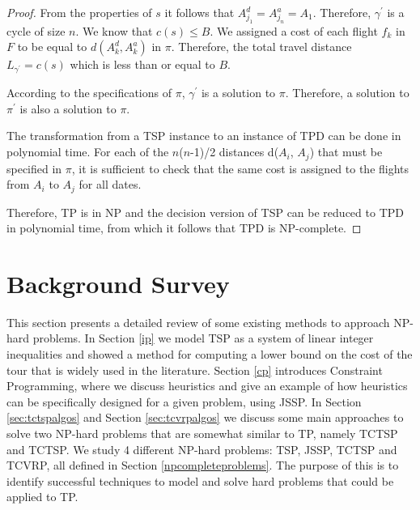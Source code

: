 \documentclass{mprop}
\theoremstyle{definition}
\begin{document}
\begin{proof}
From the properties of $s$ it follows that $A^{d}_{j_{1}} = A^{a}_{j_{n}} = A_{1}$. Therefore, $\gamma^{\prime}$ is a cycle of size $n$. We know that $c(s) \leq B$. We assigned a cost of each flight $f_{k}$ in $F$ to be equal to $d(A^{d}_{k}, A^{a}_{k})$ in $\pi$. Therefore, the total travel distance $L_{\gamma^{\prime}} = c(s)$ which is less than or equal to $B$.

According to the specifications of $\pi$, $\gamma^{\prime}$ is a solution to $\pi$. Therefore, a solution to $\pi^{\prime}$ is also a solution to $\pi$.

The transformation from a TSP instance to an instance of TPD can be done in polynomial time. For each of the $n$($n$-1)/2 distances d($A_{i}$, $A_{j}$) that must be specified in $\pi$, it is sufficient to check that the same cost is assigned to the flights from $A_{i}$ to $A_{j}$ for all dates.

Therefore, TP is in NP and the decision version of TSP can be reduced to TPD in polynomial time, from which it follows that TPD is NP-complete.

\end{proof}

\section{Background Survey}
\label{sec:existingwork}
This section presents a detailed review of some existing methods to approach NP-hard problems. In Section \ref{ip} we model TSP as a system of linear integer inequalities and showed a method for computing a lower bound on the cost of the tour that is widely used in the literature. Section \ref{cp} introduces Constraint Programming, where we discuss heuristics and give an example of how heuristics can be specifically designed for a given problem, using JSSP. In Section \ref{sec:tctspalgos} and Section \ref{sec:tcvrpalgos} we discuss some main approaches to solve two NP-hard problems that are somewhat similar to TP, namely TCTSP and TCTSP.
We study 4 different NP-hard problems: TSP, JSSP, TCTSP and TCVRP, all defined in Section \ref{npcompleteproblems}. The purpose of this is to identify successful techniques to model and solve hard problems that could be applied to TP.
\end{document}
